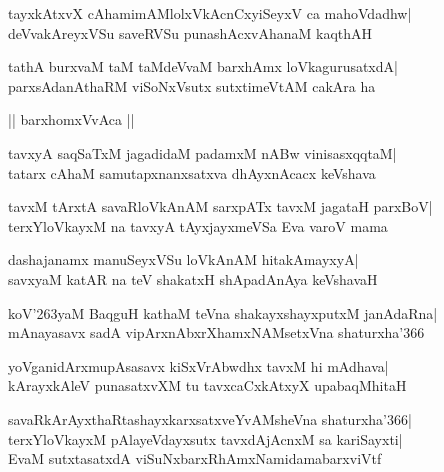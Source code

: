 \documentclass[twoside,12pt,openright]{book}
\def\S{\char'263}
\newcounter{shloka}[chapter]
\begin{document}
\begin{shloka}%
tayxkAtxvX cAhamimAMlolxVkAcnCxyiSeyxV ca mahoVdadhw|\\
deVvakAreyxVSu saveRVSu punashAcxvAhanaM kaqthAH
\end{shloka}

\begin{shloka}%
tathA burxvaM taM taMdeVvaM barxhAmx loVkagurusatxdA|\\
parxsAdanAthaRM viSoNxVsutx sutxtimeVtAM cakAra ha
\end{shloka}

\begin{center}
|| barxhomxVvAca ||
\end{center}
\begin{shloka}%
tavxyA saqSaTxM jagadidaM padamxM nABw vinisasxqqtaM|\\
tatarx cAhaM samutapxnanxsatxva dhAyxnAcacx keVshava
\end{shloka}

\begin{shloka}%
tavxM tArxtA savaRloVkAnAM sarxpATx tavxM jagataH parxBoV|\\
terxYloVkayxM na tavxyA tAyxjayxmeVSa Eva varoV mama
\end{shloka}

\begin{shloka}%
dashajanamx manuSeyxVSu loVkAnAM hitakAmayxyA|\\
savxyaM katAR na teV shakatxH shApadAnAya keVshavaH
\end{shloka}

\begin{shloka}%
koV\S yaM BaqguH kathaM teVna shakayxshayxputxM janAdaRna|\\
mAnayasavx sadA vipArxnAbxrXhamxNAMsetxVna shaturxha\char'366
\end{shloka}

\begin{shloka}%
yoVganidArxmupAsasavx kiSxVrAbwdhx tavxM hi mAdhava|\\
kArayxkAleV punasatxvXM tu tavxcaCxkAtxyX upabaqMhitaH
\end{shloka}

\begin{shloka}%
savaRkArAyxthaRtashayxkarxsatxveYvAMsheVna shaturxha\char'366|\\
terxYloVkayxM pAlayeVdayxsutx tavxdAjAcnxM sa kariSayxti|\\
EvaM sutxtasatxdA viSuNxbarxRhAmxNamidamabarxviVtf
\end{shloka}
\end{document}
